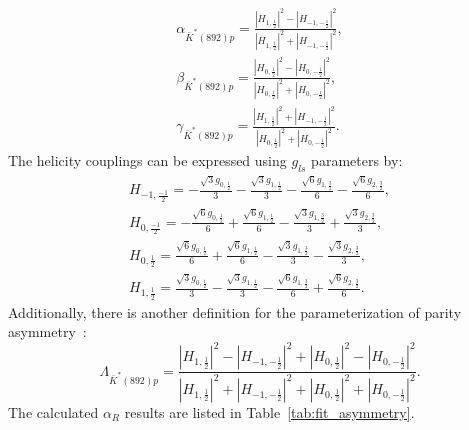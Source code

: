 \begin{equation}
    \begin{split}
    \alpha_{\bar{K}^*(892)p} = \frac{|H_{1,\frac{1}{2}}|^2 - |H_{-1,-\frac{1}{2}}|^2}{|H_{1,\frac{1}{2}}|^2 +|H_{-1,-\frac{1}{2}}|^2}, \\
    \beta_{\bar{K}^*(892)p} = \frac{|H_{0,\frac{1}{2}}|^2 - |H_{0,-\frac{1}{2}}|^2}{|H_{0,\frac{1}{2}}|^2 +|H_{0,-\frac{1}{2}}|^2}, \\
    \gamma_{\bar{K}^*(892)p} = \frac{|H_{1,\frac{1}{2}}|^2 + |H_{-1,-\frac{1}{2}}|^2}{|H_{0,\frac{1}{2}}|^2 +|H_{0,-\frac{1}{2}}|^2}.
    \end{split}
\end{equation}
The helicity couplings can be expressed using $g_{ls}$ parameters by:
\begin{equation}
    \begin{split}
        H_{ -1, \frac{-1}{2} } = - \frac{\sqrt{3} g_{0,\frac{1}{2}}}{3} - \frac{\sqrt{3} g_{1,\frac{1}{2}}}{3} - \frac{\sqrt{6} g_{1,\frac{3}{2}}}{6} - \frac{\sqrt{6} g_{2,\frac{3}{2}}}{6},\\
        H_{ 0, \frac{-1}{2} } = - \frac{\sqrt{6} g_{0,\frac{1}{2}}}{6} + \frac{\sqrt{6} g_{1,\frac{1}{2}}}{6} - \frac{\sqrt{3} g_{1,\frac{3}{2}}}{3} + \frac{\sqrt{3} g_{2,\frac{3}{2}}}{3},\\
        H_{ 0, \frac{1}{2} } = \frac{\sqrt{6} g_{0,\frac{1}{2}}}{6} + \frac{\sqrt{6} g_{1,\frac{1}{2}}}{6} - \frac{\sqrt{3} g_{1,\frac{3}{2}}}{3} - \frac{\sqrt{3} g_{2,\frac{3}{2}}}{3},\\
        H_{ 1, \frac{1}{2} } = \frac{\sqrt{3} g_{0,\frac{1}{2}}}{3} - \frac{\sqrt{3} g_{1,\frac{1}{2}}}{3} - \frac{\sqrt{6} g_{1,\frac{3}{2}}}{6} + \frac{\sqrt{6} g_{2,\frac{3}{2}}}{6}.
    \end{split}
\end{equation}
Additionally, there is another definition for the parameterization of parity asymmetry~\cite{Hrivnac:1994jx}:
\begin{equation}
    \Lambda_{\bar{K}^*(892)p} = \frac{|H_{1,\frac{1}{2}}|^2 - |H_{-1,-\frac{1}{2}}|^2 + |H_{0,\frac{1}{2}}|^2 - |H_{0,-\frac{1}{2}}|^2}{|H_{1,\frac{1}{2}}|^2 +|H_{-1,-\frac{1}{2}}|^2 + |H_{0,\frac{1}{2}}|^2 +|H_{0,-\frac{1}{2}}|^2}. 
\end{equation}
The calculated $\alpha_R$ results are listed in Table~\ref{tab:fit_asymmetry}. 

